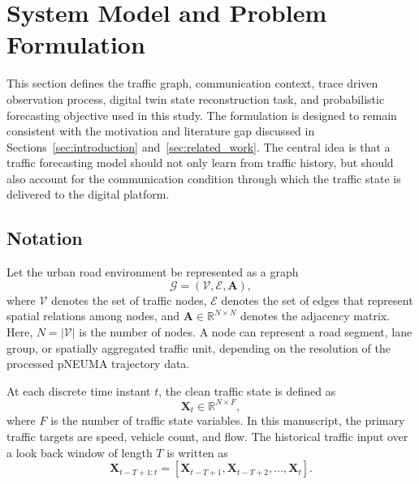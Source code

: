 \documentclass[pdflatex,sn-mathphys-num]{sn-jnl}%
\theoremstyle{thmstyleone}%
\theoremstyle{thmstyletwo}%
\theoremstyle{thmstylethree}%
\begin{document}
\section{System Model and Problem Formulation}
\label{sec:system_model}

This section defines the traffic graph, communication context, trace driven observation process, digital twin state reconstruction task, and probabilistic forecasting objective used in this study. The formulation is designed to remain consistent with the motivation and literature gap discussed in Sections~\ref{sec:introduction} and~\ref{sec:related_work}. The central idea is that a traffic forecasting model should not only learn from traffic history, but should also account for the communication condition through which the traffic state is delivered to the digital platform.

\subsection{Notation}

Let the urban road environment be represented as a graph
\begin{equation}
    \mathcal{G} = \left(\mathcal{V}, \mathcal{E}, \mathbf{A}\right),
\end{equation}
where \(\mathcal{V}\) denotes the set of traffic nodes, \(\mathcal{E}\) denotes the set of edges that represent spatial relations among nodes, and \(\mathbf{A}\in\mathbb{R}^{N\times N}\) denotes the adjacency matrix. Here, \(N = |\mathcal{V}|\) is the number of nodes. A node can represent a road segment, lane group, or spatially aggregated traffic unit, depending on the resolution of the processed pNEUMA trajectory data.

At each discrete time instant \(t\), the clean traffic state is defined as
\begin{equation}
    \mathbf{X}_{t} \in \mathbb{R}^{N\times F},
\end{equation}
where \(F\) is the number of traffic state variables. In this manuscript, the primary traffic targets are speed, vehicle count, and flow. The historical traffic input over a look back window of length \(T\) is written as
\begin{equation}
    \mathbf{X}_{t-T+1:t} =
    \left[
    \mathbf{X}_{t-T+1},
    \mathbf{X}_{t-T+2},
    \ldots,
    \mathbf{X}_{t}
    \right].
\end{equation}
\end{document}
